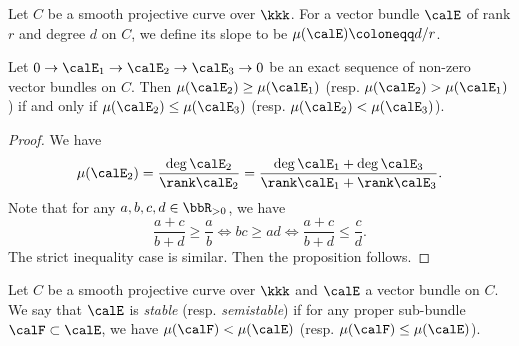     \begin{definition}\label{def:slope_of_vector_bundles_over_curves}
        Let \(C\) be a smooth projective curve over \(\kkk\).
        For a vector bundle \(\calE\) of rank \(r\) and degree \(d\) on \(C\), we define its slope to be \(\mu(\calE) \coloneqq d/r\).
    \end{definition}

    \begin{proposition}\label{lem:slope_of_exact_sequence}
        Let \(0 \to \calE_1 \to \calE_2 \to \calE_3 \to 0\) be an exact sequence of non-zero vector bundles on \(C\).
        Then \(\mu(\calE_2) \geq \mu(\calE_1)\) (resp. \(\mu(\calE_2) > \mu(\calE_1)\)) if and only if \(\mu(\calE_2) \leq \mu(\calE_3)\) (resp. \(\mu(\calE_2) < \mu(\calE_3)\)).
    \end{proposition}
    \begin{proof}
        We have 
        \[ \mu(\calE_2) = \frac{\deg \calE_2}{\rank \calE_2} = \frac{\deg \calE_1 + \deg \calE_3}{\rank \calE_1 + \rank \calE_3}. \]
        Note that for any \(a,b,c,d \in \bbR_{>0}\), we have 
        \[\frac{a+c}{b+d} \geq \frac{a}{b} \iff bc \geq ad \iff \frac{a+c}{b+d} \leq \frac{c}{d}. \]
        The strict inequality case is similar.
        Then the proposition follows.
    \end{proof}

    \begin{definition}\label{def:stable_and_semistable_vector_bundles_over_curves}
        Let \(C\) be a smooth projective curve over \(\kkk\) and \(\calE\) a vector bundle on \(C\).
        We say that \(\calE\) is \emph{stable} (resp. \emph{semistable}) if for any proper sub-bundle \(\calF \subset \calE\), we have \(\mu(\calF) < \mu(\calE)\) (resp. \(\mu(\calF) \leq \mu(\calE)\)).
    \end{definition}


